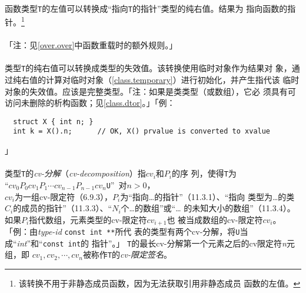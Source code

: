\paragraph{}
函数类型\texttt{T}的左值可以转换成``指向\texttt{T}的指针''类型的纯右值。结果为
指向函数的指针。\footnote{该转换不用于非静态成员函数，因为无法获取引用非静态成员
函数的左值。}

\paragraph{}
「注：见\ref{over.over}中函数重载时的额外规则。」

\paragraph{}
类型\texttt{T}的纯右值可以转换成类型的失效值。该转换使用临时对象作为结果对
象，通过纯右值的计算对临时对象（\ref{class.temporary}）进行初始化，并产生指代该
临时对象的失效值。应该是完整类型。「注：如果是类类型（或数组），它必
须具有可访问未删除的析构函数；见\ref{class.dtor}。」「例：
\begin{lstlisting}
  struct X { int n; }
  int k = X().n;      // OK, X() prvalue is converted to xvalue
\end{lstlisting}」

\paragraph{}
类型\texttt{T}的\textit{cv-分解}（\textit{cv-decomposition}）指$cv_i$和$P_i$的序
列，使得\texttt{T}为                                                          \\
\mbox{\qquad\qquad “$cv_0P_0cv_1P_1\cdots cv_{n-1}P_{n-1}cv_n$\texttt{U}”
  对$n > 0$，}                                                                \\
$cv_i$为一组cv-限定符（6.9.3），$P_i$为“指向\ldots 的指针”（11.3.1）、“指向
类型为\ldots 的类$C_i$的成员的指针”（11.3.3）、“$N_i$个\ldots 的数组”或“\ldots
的未知大小的数组”（11.3.4）。如果$P_i$指代数组，元素类型的cv-限定符$cv_{i+1}$也
被当成数组的cv-限定符$cv_i$。「例：由\textit{type-id} \texttt{const int **}所代
表的类型有两个cv-分解，将\texttt{U}当成``\textit{int}''和``\texttt{const int}的
指针''。」 \texttt{T}的最长cv-分解第一个元素之后的cv限定符\textit{n}元组，即
$cv_1, cv_2, \cdots, cv_n$被称作\texttt{T}的\textit{cv-限定签名}。

